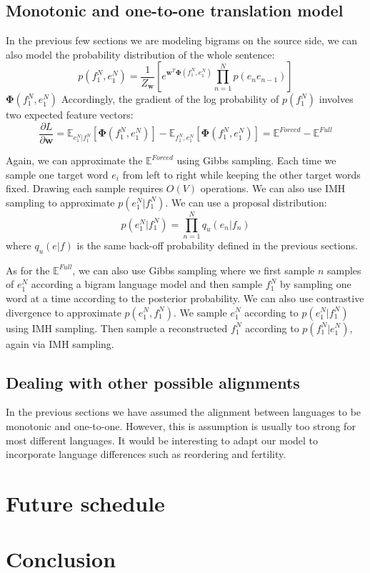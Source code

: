 \subsection{Monotonic and one-to-one translation model}
In the previous few sections we are modeling bigrams on the source side, we can also model the probability distribution of the whole sentence:
\begin{equation}
p(f_1^N, e_1^N) = \frac{1}{Z_{\mathbf{w}}}  [e^{\mathbf{w}^T\mathbf{\Phi}(f_1^N, e_1^N)}  \prod_{n=1}^N p(e_ne_{n-1})]
\end{equation}
$\mathbf{\Phi}(f_1^N, e_1^N)$ Accordingly, the gradient of the log probability of $p(f_1^N)$ involves two expected feature vectors:
\begin{equation}
\frac{\partial L} { \partial \mathbf{w}} = \mathbb{E}_{e_1^N|f_1^N} \left[ \mathbf{\Phi}(f_1^N, e_1^N) \right] - 
   \mathbb{E}_{f_1^N,e_1^N} \left[ \mathbf{\Phi}(f_1^N, e_1^N) \right]=  \mathbb{E}^{Forced} - \mathbb{E}^{Full}
\end{equation}


Again, we can approximate the $\mathbb{E}^{Forced}$ using Gibbs sampling. Each time we sample one target word $e_i$ from left
to right while keeping the other target words fixed. Drawing each sample requires $O(V)$ operations.
We can also use IMH sampling to approximate $p(e_1^N|f_1^N)$. We can use a proposal distribution:
$$p(e_1^N|f_1^N) = \prod_{n=1}^{N} q_u (e_n|f_n)$$
where $q_u(e|f)$ is the same back-off probability defined in the previous sections.


As for the $\mathbb{E}^{Full}$, we can also use Gibbs sampling where we first sample $n$ samples of $e_1^N$ according a bigram language model and then sample $f_1^N$ by sampling one word at a time according to the posterior probability. We can also use contrastive divergence to approximate $p(e_1^N, f_1^N)$. We sample $e_1^N$ according to $p(e_1^N|f_1^N)$ using IMH sampling. Then sample a reconstructed $f_1^N$ according to $p(f_1^N| e_1^N)$, again via IMH sampling.
\subsection{Dealing with other possible alignments}
In the previous sections we have assumed the alignment between languages to be monotonic and one-to-one. However, this is assumption is usually too strong for
most different languages. It would be interesting to adapt our model to incorporate language differences such as reordering and fertility.
\section{Future schedule}

\section{Conclusion}
